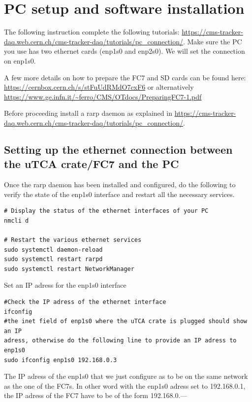 \documentclass[10pt,a4paper]{article}
\begin{document}
\section{PC setup and software installation}

The following instruction complete the following tutorials:
\url{https://cms-tracker-daq.web.cern.ch/cms-tracker-daq/tutorials/pc_connection/}.
Make sure the PC you use has two ethernet cards (enp1s0 and enp2s0). We will set the connection on enp1s0.

A few more details on how to prepare the FC7 and SD cards can be found here:
\url{https://cernbox.cern.ch/s/stFuUdRMdO7cxF6} or alternatively \url{https://www.ge.infn.it/~ferro/CMS/OTdocs/PreparingFC7-1.pdf}

Before proceeding install a rarp daemon as explained in \url{https://cms-tracker-daq.web.cern.ch/cms-tracker-daq/tutorials/pc_connection/}.

\subsection{Setting up the ethernet connection between the uTCA crate/FC7 and the PC} 
\label{fc7connection}
Once the rarp daemon has been installed and configured, do the following to verify the state of the enp1s0 interface and restart all the necessary services.
\begin{framed}
\begin{verbatim}
# Display the status of the ethernet interfaces of your PC
nmcli d 

# Restart the various ethernet services
sudo systemctl daemon-reload
sudo systemctl restart rarpd
sudo systemctl restart NetworkManager
\end{verbatim}
\end{framed}

Set an IP adress for the enp1s0 interface
\begin{framed}
\begin{verbatim}
#Check the IP adress of the ethernet interface
ifconfig 
#the inet field of enp1s0 where the uTCA crate is plugged should show an IP 
adress, otherwise do the following line to provide an IP adress to enp1s0
sudo ifconfig enp1s0 192.168.0.3  
\end{verbatim}
\end{framed}


The IP adress of the enp1s0 that we just configure as to be on the same network as the one of the FC7s. In other word with the enp1s0 adress set to 192.168.0.1, the IP adress of the FC7 have to be of the form 192.168.0.---
\end{document}
